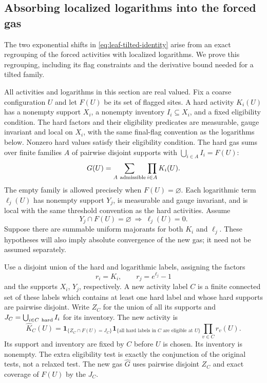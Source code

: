 \subsection{Absorbing localized logarithms into the forced gas}
\label{sec:soft-log-fusion}
The two exponential shifts in \eqref{eq:leaf-tilted-identity} arise
from an exact regrouping of the forced activities with localized
logarithms. We prove this regrouping, including its flag constraints
and the derivative bound needed for a tilted family.

All activities and logarithms in this section are real valued.
Fix a coarse configuration $U$ and let $F(U)$ be its set of flagged
sites. A hard activity $K_i(U)$ has a nonempty support $X_i$,
a nonempty inventory $I_i\subseteq X_i$, and a fixed eligibility
condition. The hard factors and their eligibility predicates are
measurable, gauge invariant and local on $X_i$, with the same
final-flag convention as the logarithms below. Nonzero hard values
satisfy their eligibility condition. The hard gas
sums over finite families $A$ of pairwise disjoint supports with
$\bigcup_{i\in A}I_i=F(U)$:
\[
                    G(U)=\sum_{A\ {\rm admissible}}\prod_{i\in A}K_i(U).
\]
The empty family is allowed precisely when $F(U)=\varnothing$.
Each logarithmic term $\ell_j(U)$ has nonempty support $Y_j$,
is measurable and gauge invariant, and is local with the same
threshold convention as the hard activities. Assume
\begin{equation}\label{eq:fusion-vanishing}
                  Y_j\cap F(U)=\varnothing\ \Longrightarrow\ \ell_j(U)=0.
\end{equation}
Suppose there are summable uniform majorants for both $K_i$ and
$\ell_j$. These hypotheses will also imply absolute convergence of
the new gas; it need not be assumed separately.

Use a disjoint union of the hard and logarithmic labels, assigning
the factors
\[
                        r_i=K_i,\qquad r_j=e^{\ell_j}-1
\]
and the supports $X_i$, $Y_j$, respectively. A new activity label
$C$ is a finite connected set of these labels which contains at
least one hard label and whose hard supports are pairwise disjoint.
Write $Z_C$ for the union of all its supports and
$J_C=\bigcup_{i\in C\ {\rm hard}}I_i$ for its inventory. The new
activity is
\begin{equation}\label{eq:fusion-new-activity}
 \widehat K_C(U)=
 \mathbf1_{\{Z_C\cap F(U)=J_C\}}
 \mathbf1_{\{\text{all hard labels in }C\text{ are eligible at }U\}}
                         \prod_{v\in C}r_v(U).
\end{equation}
Its support and inventory are fixed by $C$ before $U$ is chosen.
Its inventory is nonempty. The extra eligibility test is exactly
the conjunction of the original tests, not a relaxed test. The
new gas $\widehat G$ uses pairwise disjoint $Z_C$ and exact coverage
of $F(U)$ by the $J_C$.


